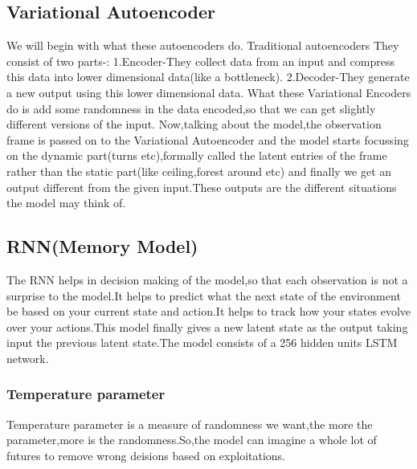 \documentclass{article}
\begin{document}
\subsection{Variational Autoencoder}
We will begin with what these autoencoders do.\newline\newline
Traditional autoencoders\newline\newline
They consist of two parts-:\newline\newline
1.Encoder-They collect data from an input and compress this data into lower dimensional data(like a bottleneck).\newline\newline
2.Decoder-They generate a new output using this lower dimensional data.\newline\newline
What these Variational Encoders do is add some randomness in the data encoded,so that we can get slightly different versions of the input.\newline\newline
Now,talking about the model,the observation frame is passed on to the Variational Autoencoder and the model starts focussing on the dynamic part(turns etc),formally called the latent entries of the frame rather than the static part(like ceiling,forest around etc) and finally we get an output different from the given input.These outputs are the different situations the model may think of.
\subsection{RNN(Memory Model)}
The RNN helps in decision making of the model,so that each observation is not a surprise to the model.It helps to predict what the next state of the environment be based on your current state and action.It helps to track how your states evolve over your actions.This model finally gives a new latent state as the output taking input the previous latent state.The model consists of a 256 hidden units LSTM network.\newline
\subsubsection{Temperature parameter}
Temperature parameter is a measure of randomness we want,the more the parameter,more is the randomness.So,the model can imagine a whole lot of futures to remove wrong deisions based on exploitations.
\end{document}
